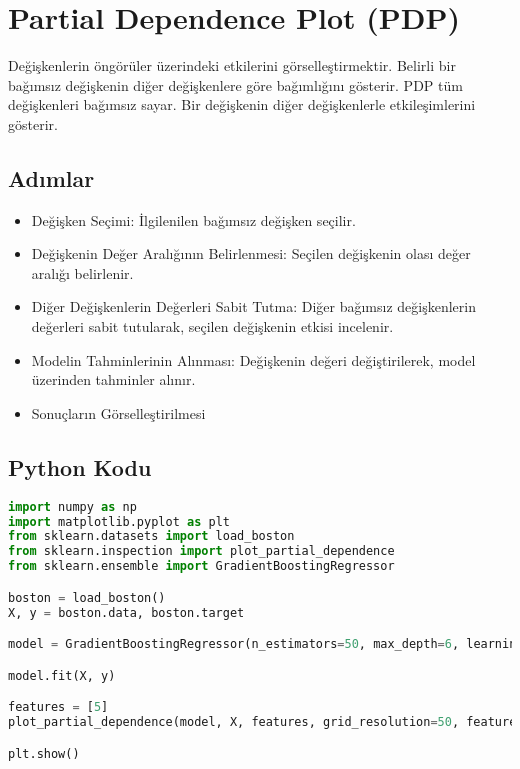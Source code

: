 \section{Partial Dependence Plot (PDP)}
Değişkenlerin öngörüler üzerindeki etkilerini görselleştirmektir. Belirli bir bağımsız değişkenin diğer değişkenlere göre bağımlığını gösterir. PDP tüm değişkenleri bağımsız sayar. Bir değişkenin diğer değişkenlerle etkileşimlerini gösterir.

\subsection{Adımlar}
\begin{itemize}
    \item Değişken Seçimi: İlgilenilen bağımsız değişken seçilir.
    \item Değişkenin Değer Aralığının Belirlenmesi: Seçilen değişkenin olası değer aralığı belirlenir.
    \item Diğer Değişkenlerin Değerleri Sabit Tutma: Diğer bağımsız değişkenlerin değerleri sabit tutularak, seçilen değişkenin etkisi incelenir.
    \item Modelin Tahminlerinin Alınması: Değişkenin değeri değiştirilerek, model üzerinden tahminler alınır.
    \item Sonuçların Görselleştirilmesi
\end{itemize}

\subsection{Python Kodu}

\begin{lstlisting}[language=Python]
import numpy as np
import matplotlib.pyplot as plt
from sklearn.datasets import load_boston
from sklearn.inspection import plot_partial_dependence
from sklearn.ensemble import GradientBoostingRegressor

boston = load_boston()
X, y = boston.data, boston.target

model = GradientBoostingRegressor(n_estimators=50, max_depth=6, learning_rate=0.1, loss='huber', random_state=4242)

model.fit(X, y)

features = [5]
plot_partial_dependence(model, X, features, grid_resolution=50, feature_names=boston.feature_names)

plt.show()
\end{lstlisting}

\newpage